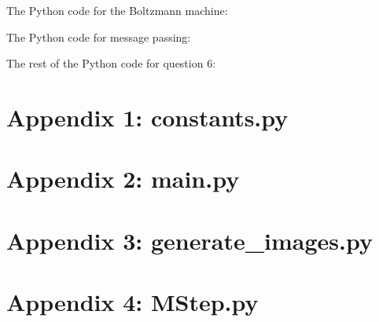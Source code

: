 \documentclass[12pt]{article}
\begin{document}
\newpage
The Python code for the Boltzmann machine:


\newpage
The Python code for message passing:


\newpage
The rest of the Python code for question 6:


\newpage
\section*{Appendix 1: constants.py}

\newpage
\section*{Appendix 2: main.py}

\newpage
\section*{Appendix 3: generate\_images.py}

\newpage
\section*{Appendix 4: MStep.py}

\end{document}
